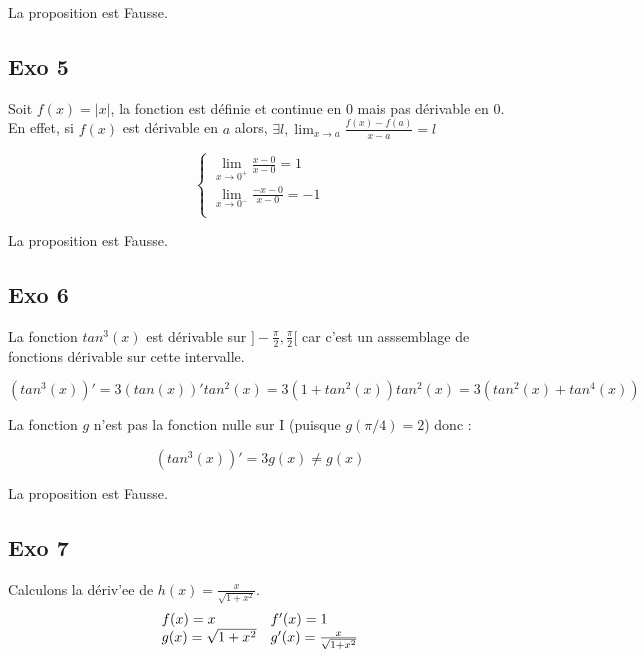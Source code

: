\documentclass[]{book}
\theoremstyle{definition}
\begin{document}
La proposition est Fausse.\\




\subsection*{Exo 5}
Soit $f(x) = |x|$, la fonction est d\'efinie et continue en $0$ mais pas d\'erivable en $0$.
En effet, si $f(x)$ est d\'erivable en $a$ alors, $\exists l, \lim_{x \to a}\frac{f(x)-f(a)}{x-a} = l$

$$ 
\left\{ 
\begin{array}{l}
 \lim_{x \to 0^{+}} \frac{x - 0}{x-0} = 1 \\
 \lim_{x \to 0^{-}} \frac{-x - 0}{x-0} = -1 \\
\end{array}
\right. 
$$

La proposition est Fausse.

\subsection*{Exo 6}
La fonction $tan^3(x)$ est d\'erivable sur $]-\frac{\pi}{2},\frac{\pi}{2}[$ car c'est un asssemblage de fonctions d\'erivable sur cette intervalle.

$$(tan^3(x))' = 3(tan(x))'tan^2(x)=3(1+tan^2(x))tan^2(x) = 3(tan^2(x)+tan^4(x))$$

La fonction $g$ n’est pas la fonction nulle sur I (puisque $g(\pi/4) = 2$) donc :

$$(tan^3(x))' = 3g(x) \neq g(x)$$

La proposition est Fausse.


\subsection*{Exo 7}
Calculons la d\'eriv'ee de $h(x) = \frac{x}{\sqrt{1+x^2}}$.
$$
\begin{array}{l l}
 f(x) = x & f'(x) = 1 \\
 g(x) = \sqrt{1+x^2} & g'(x) = \frac{x}{\sqrt{1+x^2}} \\
\end{array}
$$
\end{document}
